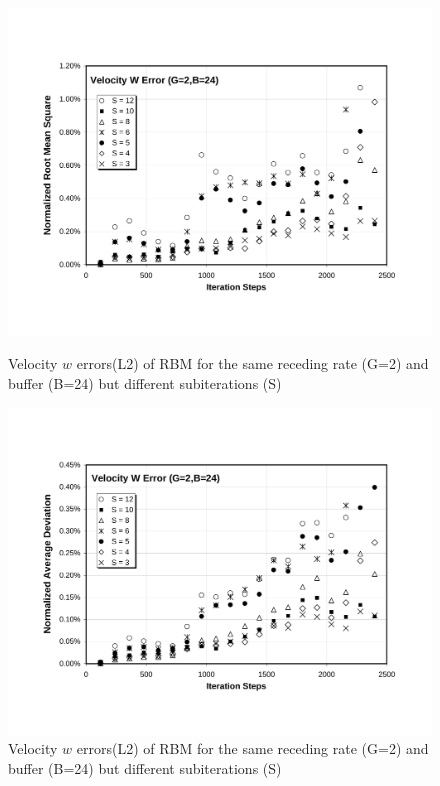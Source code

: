 \cp

\begin{figure}[htbp]
  \begin{center}
\includegraphics[scale=0.6]{../figures/Exp3-CASE1-dt0.005/G_2_B_24/G2-B24-W-NRMS.pdf}
    \caption{Velocity $w$ errors(L2) of RBM for the same receding rate (G=2) and buffer (B=24) but different subiterations (S)}
        \vspace{0.5in}
\includegraphics[scale=0.6]{../figures/Exp3-CASE1-dt0.005/G_2_B_24/G2-B24-W-NAD.pdf}
    \caption{Velocity $w$ errors(L2) of RBM for the same receding rate (G=2) and buffer (B=24) but different subiterations (S)}
  \end{center}
\end{figure}

